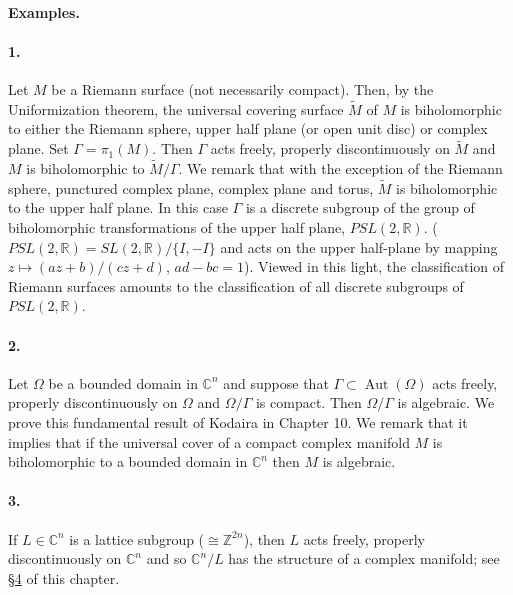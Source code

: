 \paragraph*{Examples.}
\paragraph*{1.} Let $M$ be a Riemann surface (not necessarily compact). Then, by the Uniformization theorem, the universal covering surface $\widetilde M$ of $M$ is biholomorphic to either the Riemann sphere, upper half plane (or open unit disc) or complex plane. Set $\Gamma=\pi_1(M)$. Then $\Gamma$ acts freely, properly discontinuously on $\widetilde M$ and $M$ is biholomorphic to $\widetilde M/\Gamma$. We remark that with the exception of the Riemann sphere, punctured complex plane, complex plane and torus, $\widetilde M$ is biholomorphic to the upper half plane. In this case $\Gamma$ is a discrete subgroup of the group of biholomorphic transformations of the upper half plane, $PSL(2,\mathbb R)$. ($PSL(2,\mathbb R)=SL(2,\mathbb R)/\{I,-I\}$ and acts on the upper half-plane by mapping $z\longmapsto(az+b)/(cz+d)$, $ad-bc=1$). Viewed in this light, the classification of Riemann surfaces amounts to the classification of all discrete subgroups of $PSL(2,\mathbb R)$.

\paragraph*{2.} Let $\Omega$ be a bounded domain in $\mathbb C^n$ and suppose that $\Gamma\subset\operatorname{Aut}(\Omega)$ acts freely, properly discontinuously on $\Omega$ and $\Omega/\Gamma$ is compact. Then $\Omega/\Gamma$ is algebraic. We prove this fundamental result of Kodaira \cite{bib:I:kodaira-k:1} in Chapter 10. We remark that it implies that if the universal cover of a compact complex manifold $M$ is biholomorphic to a bounded domain in $\mathbb C^n$ then $M$ is algebraic.

\paragraph*{3.} If $L\in\mathbb C^n$ is a lattice subgroup ($\cong\mathbb Z^{2n}$), then $L$ acts freely, properly discontinuously on $\mathbb C^n$ and so $\mathbb C^n/L$ has the structure of a complex manifold; see \hyperref[sec:4:4]{\S4} of this chapter.
